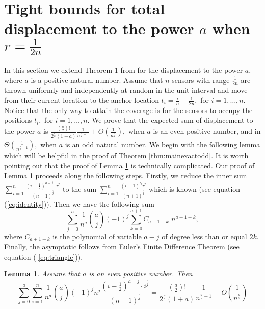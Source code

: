 \documentclass[final,5p,times,twocolumn]{elsarticle_mod}
\newtheorem{Lemma}[theorem]{Lemma}
\begin{document}
\section{Tight bounds for total displacement to the power $a$ when $r=\frac{1}{2n}$}
\label{tight:sec}
In this section we extend Theorem 1 from \cite{spa_2013} for the displacement
to the power $a,$ where $a$ is a positive natural number.  Assume that $n$ sensors with range $\frac{1}{2n}$ are thrown uniformly and independently at random in the unit interval
and move from their current location to the anchor location $t_i=\frac{i}{n}-\frac{1}{2n},$ for $i=1,\dots,n.$
Notice that the only way to attain the coverage is for the sensors to occupy the positions $t_i,$ for $i=1,\dots,n.$
We prove that the expected sum of displacement to the power $a$ is 
$\frac{\left(\frac{a}{2}\right)!}{2^{\frac{a}{2}}(1+a)}\frac{1}{n^{\frac{a}{2}-1}}+
O\left(\frac{1}{n^{\frac{a}{2}}}\right),$
when $a$ is an even positive number,
and in $\Theta\left(\frac{1}{n^{\frac{a}{2}-1}}\right), $ when $a$ is an odd natural number.
We begin with the following lemma which will be helpful in the proof of Theorem \ref{thm:mainexactodd}.
It is worth pointing out that the proof of Lemma \ref{lem:sum} is technically complicated.
Our proof of Lemma \ref{lem:sum} proceeds along
the following steps.
Firstly, we  reduce the inner sum  
$\sum_{i=1}^{n} \frac{ \left(i-\frac{1}{2}\right)^{a-j}\cdot i^{\overline{j}}}{(n+1)^{\overline{j}}}$
to the sum 
$\sum_{i=1}^{n}\frac{(i-1)^{\underline{l_2}}i^{\overline{j}}}{(n+1)^{\overline{j}}}$
which is known (see equation (\ref{eq:identity})).
Then we have the following sum
$$
\sum_{j=0}^{a}\frac{1}{n^a}\binom{a}{j}(-1)^j\sum_{k=0}^{a+1}C_{a+1-k}\,\, n^{a+1-k},$$
where $C_{a+1-k}$ is the polynomial of variable $a-j$ of degree less than or equal $2k.$
Finally, the asymptotic follows from Euler's Finite Difference Theorem (see equation ( \ref{eq:triangle})).
\begin{Lemma}
\label{lem:sum}
Assume that $a$ is an even positive number. Then
$$
\sum_{j=0}^{a}\sum_{i=1}^{n}\frac{1}{n^a}\binom{a}{j}(-1)^jn^j  \frac{ \left(i-\frac{1}{2}\right)^{a-j}\cdot i^{\overline{j}}}{(n+1)^{\overline{j}}}=
\frac{\left(\frac{a}{2}\right)!}{2^{\frac{a}{2}}(1+a)}\frac{1}{n^{\frac{a}{2}-1}}+
O\left(\frac{1}{n^{\frac{a}{2}}}\right)
$$
\end{Lemma}
\end{document}
